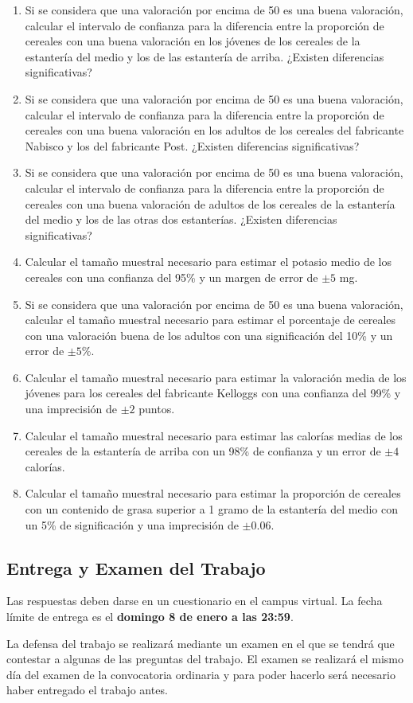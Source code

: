 \documentclass[a4paper,titlepage]{article}
\begin{document}
\begin{enumerate}[leftmargin=*]
\item Si se considera que una valoración por encima de 50 es una buena valoración, calcular el intervalo de confianza para la diferencia entre la proporción de cereales con una buena valoración en los jóvenes de los cereales de la estantería del medio y los de las estantería de arriba. ¿Existen diferencias significativas?
\item Si se considera que una valoración por encima de 50 es una buena valoración, calcular el intervalo de confianza para la diferencia entre la proporción de cereales con una buena valoración en los adultos de los cereales del fabricante Nabisco y los del fabricante Post. ¿Existen diferencias significativas?
\item Si se considera que una valoración por encima de 50 es una buena valoración, calcular el intervalo de confianza para la diferencia entre la proporción de cereales con una buena valoración de adultos de los cereales de la estantería del medio y los de las otras dos estanterías. ¿Existen diferencias significativas?
\item Calcular el tamaño muestral necesario para estimar el potasio medio de los cereales con una confianza del 95\% y un margen de error de $\pm 5$ mg.
\item Si se considera que una valoración por encima de 50 es una buena valoración, calcular el tamaño muestral necesario para estimar el porcentaje de cereales con una valoración buena de los adultos con una significación del 10\% y un error de $\pm 5$\%.
\item Calcular el tamaño muestral necesario para estimar la valoración media de los jóvenes para los cereales del fabricante Kelloggs con una confianza del 99\% y una imprecisión de $\pm 2$ puntos.
\item Calcular el tamaño muestral necesario para estimar las calorías medias de los cereales de la estantería de arriba con un 98\% de confianza y un error de $\pm 4$ calorías.
\item Calcular el tamaño muestral necesario para estimar la proporción de cereales con un contenido de grasa superior a 1 gramo de la estantería del medio con un 5\% de significación y una imprecisión de $\pm 0.06$.
\end{enumerate}

\subsection*{\color{blueceu}Entrega y Examen del Trabajo}
Las respuestas deben darse en un cuestionario en el campus virtual. La fecha límite de entrega es el \textbf{domingo 8 de enero a las 23:59}.

La defensa del trabajo se realizará mediante un examen en el que se tendrá que contestar a algunas de las preguntas del trabajo. El examen se realizará el mismo día del examen de la convocatoria ordinaria y para poder hacerlo será necesario haber entregado el trabajo antes.
\end{document}
